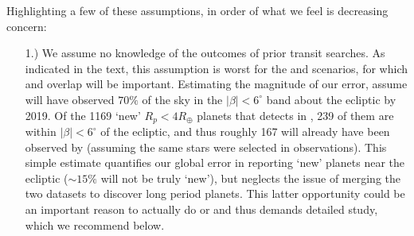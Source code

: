 Highlighting a few of these assumptions, in order of what we feel is decreasing
concern:
\begin{itemize}
\item [1.) We assume no knowledge of the outcomes of prior transit searches.]
  	As indicated in the text, this assumption is worst for the
        \elong\:and \eshort\:scenarios, for which \ktwo and \tesss
        overlap will be important.  Estimating the magnitude of our
        error, assume \ktwo will have observed $70\%$ of the sky in
        the $|\beta|<6^\circ$ band about the ecliptic by 2019.  Of the
        1169 `new' $R_p<4R_\oplus$ planets that \tess detects in
        \elong, 239 of them are within $|\beta|<6^\circ$ of the
        ecliptic, and thus roughly 167 will already have been observed by
        \ktwo (assuming the same stars were selected in \ktwo 
        observations).  
        This simple estimate quantifies our global error in reporting `new'
        planets near the ecliptic ($\sim 15\%$ will not be truly `new'), but 
        neglects the issue of merging the
        two datasets to discover long period planets.  This latter
        opportunity could be an important reason to actually do
        \elong\:or \eshort\:and thus demands detailed study, which we
        recommend below.
	

\end{itemize}
